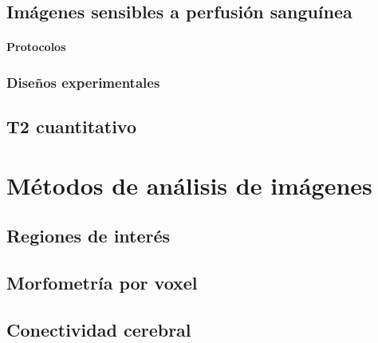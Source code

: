 \documentclass[]{memoir}          %
\begin{document}
\chapter{Imágenes sensibles a perfusión sanguínea}
\label{chapter_perfusion}
\subsection{Protocolos}
\section{Diseños experimentales}


\chapter{T2 cuantitativo}
\label{chapter_T2}









\part{Métodos de análisis de imágenes}
\label{part_metodos}


\chapter{Regiones de interés}
\label{chapter_roi}

\chapter{Morfometría por voxel}
\label{chapter_vbm}

\chapter{Conectividad cerebral}
\label{chapter_conectividad}
\end{document}
